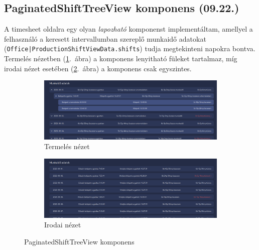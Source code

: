 \documentclass[a4paper]{article}
\newcommand{\inltxt}[1]{\texttt{#1}}
\begin{document}
\subsection{PaginatedShiftTreeView komponens (09.22.)}

A timesheet oldalra egy olyan \emph{lapozható} komponenst implementáltam, amellyel a
felhasználó a keresett intervallumban szereplő munkaidő adatokat
(\inltxt{Office|ProductionShiftViewData.shifts}) tudja megtekinteni napokra bontva. Termelés
nézetben (\ref{fig:production_view}.~ábra) a komponens lenyitható füleket tartalmaz, míg irodai nézet esetében (\ref{fig:office_view}.~ábra) a komponens csak
egyszintes.

\begin{figure}[ht]
    \centering
    \begin{subfigure}[b]{0.8\textwidth}
        \centering
        \includegraphics[width=\textwidth]{images/production_view.png}
        \caption{Termelés nézet}
        \label{fig:production_view}
    \end{subfigure}

    \vspace{1em} %

    \begin{subfigure}[b]{0.8\textwidth}
        \centering
        \includegraphics[width=\textwidth]{images/office_view.png}
        \caption{Irodai nézet}
        \label{fig:office_view}
    \end{subfigure}

    \caption{PaginatedShiftTreeView komponens}
    \label{fig:paginated_shift_tree_view}
\end{figure}
\end{document}
